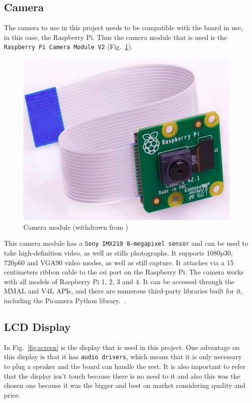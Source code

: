 \subsection{Camera}
The camera to use in this project needs to be compatible with the board in use, in this case, the Raspberry Pi.
Thus the camera module that is used is the \texttt{Raspberry Pi Camera Module V2} (Fig.~\ref{fig:camera-module}).
%
\begin{figure}[htb!]
\centering
    \includegraphics[width=0.4\columnwidth]{./img/camera-module.png}
  \caption{Camera module (withdrawn from \cite{camera-module})}%
\label{fig:camera-module}
\end{figure}

This camera module has a \texttt{Sony IMX219 8-megapixel sensor} and can be used to take high-definition video, as well as stills photographs. It supports 1080p30, 720p60 and VGA90 video modes, as well as still capture. It attaches via a 15 centimeters ribbon cable to the \gls{csi} port on the Raspberry Pi. The camera works with all models of Raspberry Pi 1, 2, 3 and 4. It can be accessed through the MMAL and V4L APIs, and there are numerous third-party libraries built for it, including the Picamera Python library.~\cite{camera-module}.

\subsection{LCD Display}

In Fig.~\ref{fig:screen} is the display that is used in this project. One advantage on this display is that it has \texttt{audio drivers}, which means that it is only necessary to plug a speaker and the board can handle the rest. It is also important to refer that the display isn't touch because there is no need to it and also this was the chosen one because it was the bigger and best on market considering quality and price.

